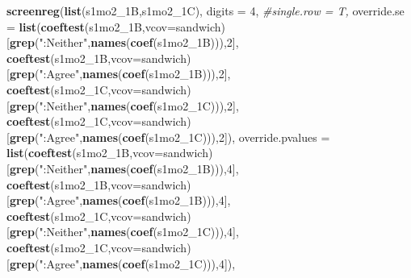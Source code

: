\documentclass[
]{article}
\newenvironment{Shaded}{\begin{snugshade}}{\end{snugshade}}
\newcommand{\CommentTok}[1]{\textcolor[rgb]{0.56,0.35,0.01}{\textit{#1}}}
\newcommand{\DataTypeTok}[1]{\textcolor[rgb]{0.13,0.29,0.53}{#1}}
\newcommand{\DecValTok}[1]{\textcolor[rgb]{0.00,0.00,0.81}{#1}}
\newcommand{\KeywordTok}[1]{\textcolor[rgb]{0.13,0.29,0.53}{\textbf{#1}}}
\newcommand{\NormalTok}[1]{#1}
\newcommand{\StringTok}[1]{\textcolor[rgb]{0.31,0.60,0.02}{#1}}
\begin{document}
\begin{Shaded}
\begin{Highlighting}[]
\KeywordTok{screenreg}\NormalTok{(}\KeywordTok{list}\NormalTok{(s1mo2_1B,s1mo2_1C), }\DataTypeTok{digits =} \DecValTok{4}\NormalTok{, }\CommentTok{#single.row = T,}
          \DataTypeTok{override.se =} \KeywordTok{list}\NormalTok{(}\KeywordTok{coeftest}\NormalTok{(s1mo2_1B,}\DataTypeTok{vcov=}\NormalTok{sandwich)[}\KeywordTok{grep}\NormalTok{(}\StringTok{":Neither"}\NormalTok{,}\KeywordTok{names}\NormalTok{(}\KeywordTok{coef}\NormalTok{(s1mo2_1B))),}\DecValTok{2}\NormalTok{],}
                             \KeywordTok{coeftest}\NormalTok{(s1mo2_1B,}\DataTypeTok{vcov=}\NormalTok{sandwich)[}\KeywordTok{grep}\NormalTok{(}\StringTok{":Agree"}\NormalTok{,}\KeywordTok{names}\NormalTok{(}\KeywordTok{coef}\NormalTok{(s1mo2_1B))),}\DecValTok{2}\NormalTok{],}
                             \KeywordTok{coeftest}\NormalTok{(s1mo2_1C,}\DataTypeTok{vcov=}\NormalTok{sandwich)[}\KeywordTok{grep}\NormalTok{(}\StringTok{":Neither"}\NormalTok{,}\KeywordTok{names}\NormalTok{(}\KeywordTok{coef}\NormalTok{(s1mo2_1C))),}\DecValTok{2}\NormalTok{],}
                             \KeywordTok{coeftest}\NormalTok{(s1mo2_1C,}\DataTypeTok{vcov=}\NormalTok{sandwich)[}\KeywordTok{grep}\NormalTok{(}\StringTok{":Agree"}\NormalTok{,}\KeywordTok{names}\NormalTok{(}\KeywordTok{coef}\NormalTok{(s1mo2_1C))),}\DecValTok{2}\NormalTok{]),}
          \DataTypeTok{override.pvalues =} \KeywordTok{list}\NormalTok{(}\KeywordTok{coeftest}\NormalTok{(s1mo2_1B,}\DataTypeTok{vcov=}\NormalTok{sandwich)[}\KeywordTok{grep}\NormalTok{(}\StringTok{":Neither"}\NormalTok{,}\KeywordTok{names}\NormalTok{(}\KeywordTok{coef}\NormalTok{(s1mo2_1B))),}\DecValTok{4}\NormalTok{],}
                                  \KeywordTok{coeftest}\NormalTok{(s1mo2_1B,}\DataTypeTok{vcov=}\NormalTok{sandwich)[}\KeywordTok{grep}\NormalTok{(}\StringTok{":Agree"}\NormalTok{,}\KeywordTok{names}\NormalTok{(}\KeywordTok{coef}\NormalTok{(s1mo2_1B))),}\DecValTok{4}\NormalTok{],}
                                  \KeywordTok{coeftest}\NormalTok{(s1mo2_1C,}\DataTypeTok{vcov=}\NormalTok{sandwich)[}\KeywordTok{grep}\NormalTok{(}\StringTok{":Neither"}\NormalTok{,}\KeywordTok{names}\NormalTok{(}\KeywordTok{coef}\NormalTok{(s1mo2_1C))),}\DecValTok{4}\NormalTok{],}
                                  \KeywordTok{coeftest}\NormalTok{(s1mo2_1C,}\DataTypeTok{vcov=}\NormalTok{sandwich)[}\KeywordTok{grep}\NormalTok{(}\StringTok{":Agree"}\NormalTok{,}\KeywordTok{names}\NormalTok{(}\KeywordTok{coef}\NormalTok{(s1mo2_1C))),}\DecValTok{4}\NormalTok{]),}

\end{Highlighting}
\end{Shaded}
\end{document}
